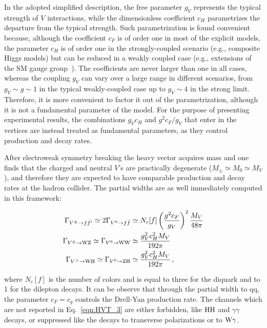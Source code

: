 In the adopted simplified description, the free parameter $g_V$ represents the typical strength of $V$ interactions, while the dimensionless coefficient $c_H$ parametrizes the departure from the typical strength.
Such parametrization is found convenient because, although the coefficient $c_F$ is of order one in most of the explicit models, the parameter $c_H$ is of order one in the strongly-coupled scenario (e.g., composite Higgs models) but can be reduced in a weakly coupled case (e.g., extensions of the SM gauge group~\cite{PhysRevD.22.727,Altarelli}). The coefficients are never larger than one in all cases, whereas the coupling $g_V$ can vary over a large range in different scenarios, from $g_V \sim g \sim 1$ in the typical weakly-coupled case up to $g_V \sim 4$ in the strong limit. Therefore, it is more convenient to factor it out of the parametrization, although it is not a fundamental parameter of the model. For the purpose of presenting experimental results, the combinations $g_Vc_H$ and $g^2c_F/g_V$ that enter in the vertices are instead treated as fundamental parameters, as they control production and decay rates.

After electroweak symmetry breaking the heavy vector acquires mass and one finds that the charged and neutral $V$'s are practically degenerate ($M_\pm \simeq M_0 \simeq M_V$),
and therefore they are expected to have comparable production and decay rates at the hadron collider. The partial widths are as well immediately computed in this framework:

\begin{eqnarray}\label{eqn:HVT_3}
\Gamma_{V^\pm \rightarrow f\bar{f}^\prime} \simeq 2\Gamma_{V^0 \rightarrow f\bar{f}} & \simeq N_c[f] \left( \frac{g^2c_F}{g_V} \right)^2\frac{M_V}{48\pi}\nonumber \\
\Gamma_{V^\pm \rightarrow \mathrm{W}\mathrm{Z}} \simeq \Gamma_{V^0 \rightarrow \mathrm{W}\mathrm{W}} & \simeq \frac{g^2_Vc^2_HM_V}{192\pi}\\
\Gamma_{V^\pm \rightarrow \mathrm{W}\mathrm{H}} \simeq \Gamma_{V^0 \rightarrow \mathrm{Z}\mathrm{H}} & \simeq \frac{g^2_Vc^2_HM_V}{192\pi}\, , \nonumber
\end{eqnarray}

\noindent where $N_c[f]$ is the number of colors and is equal to three for the diquark and to 1 for the dilepton decays.
It can be observe that through the partial width to qq, the parameter $c_F = c_q$ controls the Drell-Yan production rate.
The channels which are not reported in Eq.~\ref{eqn:HVT_3} are either forbidden, like $\mathrm{H}\mathrm{H}$ and $\gamma\gamma$ decays, or suppressed like the decays to transverse polarizations or to $\mathrm{W}\gamma$.

